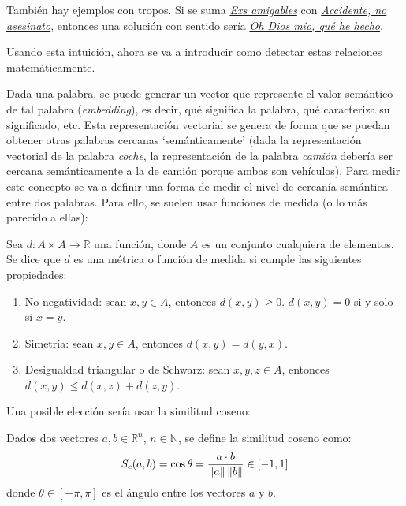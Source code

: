 También hay ejemplos con tropos. Si se suma \href{https://tvtropes.org/pmwiki/pmwiki.php/Main/AmicableExes}{\textit{Exs amigables}}
con \href{https://tvtropes.org/pmwiki/pmwiki.php/Main/AccidentNotMurder}{\textit{Accidente, no asesinato}}, entonces una solución con sentido sería
\href{https://tvtropes.org/pmwiki/pmwiki.php/Main/MyGodWhatHaveIDone}{\textit{Oh Dios mío, qué he hecho}}.

Usando esta intuición, ahora se va a introducir como detectar estas relaciones matemáticamente.

Dada una palabra, se puede generar un vector que represente el valor semántico de tal palabra (\textit{embedding}), es decir, qué significa la palabra, qué caracteriza
su significado, etc. Esta representación vectorial se genera de forma que se puedan obtener otras palabras
cercanas `semánticamente' (dada la representación vectorial de la palabra \textit{coche}, la representación de la palabra \textit{camión}
debería ser cercana semánticamente a la de camión porque ambas son vehículos). Para medir este concepto se va a definir una forma de medir el nivel
de cercanía semántica entre dos palabras. Para ello, se suelen usar funciones de medida (o lo más parecido a ellas):

\begin{definition}\label{metrica}
    Sea $d: A\times A \longrightarrow \mathbb{R}$ una función, donde $A$ es un conjunto cualquiera de elementos. Se dice que $d$ es una métrica o función
    de medida si cumple las siguientes propiedades:
    \begin{enumerate}
        \item No negatividad: sean $x,y\in A$, entonces $d(x,y)\geq 0$. $d(x,y)=0$ si y solo si $x=y$.
        \item Simetría: sean $x,y\in A$, entonces $d(x,y) = d(y,x)$.
        \item Desigualdad triangular o de Schwarz: sean $x,y,z\in A$, entonces $d(x,y) \leq d(x,z) + d(z,y)$.
    \end{enumerate}
\end{definition}

Una posible elección sería usar la similitud coseno:

\begin{definition}\label{def:similitud_coseno}
  Dados dos vectores $a,b\in\mathbb{R}^n$, $n\in\mathbb{N}$, se define la similitud coseno como:
  \[
    S_c(a,b)=\cos\theta = \frac{a\cdot b}{\left\lVert a\right\rVert\left\lVert b\right\rVert} \in [-1, 1]
  \]
donde $\theta\in[-\pi,\pi]$ es el ángulo entre los vectores $a$ y $b$.
\end{definition}

